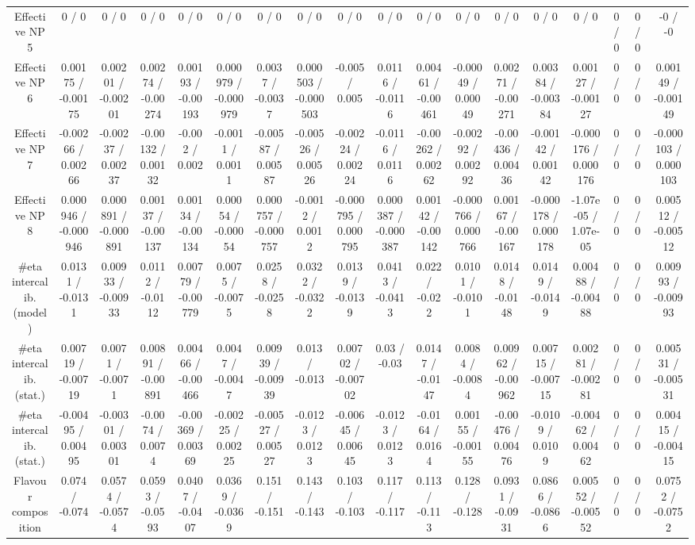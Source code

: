 \documentclass[10pt]{article}
\begin{document}
\begin{table}[htbp]
\begin{center}
\begin{tabular}{|c|c|c|c|c|c|c|c|c|c|c|c|c|c|c|c|c|c|}
  Effective NP 5 & 0 / 0 & 0 / 0 & 0 / 0 & 0 / 0 & 0 / 0 & 0 / 0 & 0 / 0 & 0 / 0 & 0 / 0 & 0 / 0 & 0 / 0 & 0 / 0 & 0 / 0 & 0 / 0 & 0 / 0 & 0 / 0 & -0 / -0 \\ 
  Effective NP 6 & 0.00175 / -0.00175 & 0.00201 / -0.00201 & 0.00274 / -0.00274 & 0.00193 / -0.00193 & 0.000979 / -0.000979 & 0.0037 / -0.0037 & 0.000503 / -0.000503 & -0.005 / 0.005 & 0.0116 / -0.0116 & 0.00461 / -0.00461 & -0.00049 / 0.00049 & 0.00271 / -0.00271 & 0.00384 / -0.00384 & 0.00127 / -0.00127 & 0 / 0 & 0 / 0 & 0.00149 / -0.00149 \\ 
  Effective NP 7 & -0.00266 / 0.00266 & -0.00237 / 0.00237 & -0.00132 / 0.00132 & -0.002 / 0.002 & -0.0011 / 0.0011 & -0.00587 / 0.00587 & -0.00526 / 0.00526 & -0.00224 / 0.00224 & -0.0116 / 0.0116 & -0.00262 / 0.00262 & -0.00292 / 0.00292 & -0.00436 / 0.00436 & -0.00142 / 0.00142 & -0.000176 / 0.000176 & 0 / 0 & 0 / 0 & -0.000103 / 0.000103 \\ 
  Effective NP 8 & 0.000946 / -0.000946 & 0.000891 / -0.000891 & 0.00137 / -0.00137 & 0.00134 / -0.00134 & 0.00054 / -0.00054 & 0.000757 / -0.000757 & -0.0012 / 0.0012 & -0.000795 / 0.000795 & 0.000387 / -0.000387 & 0.00142 / -0.00142 & -0.000766 / 0.000766 & 0.00167 / -0.00167 & -0.000178 / 0.000178 & -1.07e-05 / 1.07e-05 & 0 / 0 & 0 / 0 & 0.00512 / -0.00512 \\ 
  #eta intercalib. (model) & 0.0131 / -0.0131 & 0.00933 / -0.00933 & 0.0112 / -0.0112 & 0.00779 / -0.00779 & 0.0075 / -0.0075 & 0.0258 / -0.0258 & 0.0322 / -0.0322 & 0.0139 / -0.0139 & 0.0413 / -0.0413 & 0.022 / -0.022 & 0.0101 / -0.0101 & 0.0148 / -0.0148 & 0.0149 / -0.0149 & 0.00488 / -0.00488 & 0 / 0 & 0 / 0 & 0.00993 / -0.00993 \\ 
  #eta intercalib. (stat.) & 0.00719 / -0.00719 & 0.0071 / -0.0071 & 0.00891 / -0.00891 & 0.00466 / -0.00466 & 0.0047 / -0.0047 & 0.00939 / -0.00939 & 0.013 / -0.013 & 0.00702 / -0.00702 & 0.03 / -0.03 & 0.0147 / -0.0147 & 0.0084 / -0.0084 & 0.00962 / -0.00962 & 0.00715 / -0.00715 & 0.00281 / -0.00281 & 0 / 0 & 0 / 0 & 0.00531 / -0.00531 \\ 
  #eta intercalib. (stat.) & -0.00495 / 0.00495 & -0.00301 / 0.00301 & -0.0074 / 0.0074 & -0.00369 / 0.00369 & -0.00225 / 0.00225 & -0.00527 / 0.00527 & -0.0123 / 0.0123 & -0.00645 / 0.00645 & -0.0123 / 0.0123 & -0.0164 / 0.0164 & 0.00155 / -0.00155 & -0.00476 / 0.00476 & -0.0109 / 0.0109 & -0.00462 / 0.00462 & 0 / 0 & 0 / 0 & 0.00415 / -0.00415 \\ 
  Flavour composition & 0.074 / -0.074 & 0.0574 / -0.0574 & 0.0593 / -0.0593 & 0.0407 / -0.0407 & 0.0369 / -0.0369 & 0.151 / -0.151 & 0.143 / -0.143 & 0.103 / -0.103 & 0.117 / -0.117 & 0.113 / -0.113 & 0.128 / -0.128 & 0.0931 / -0.0931 & 0.0866 / -0.0866 & 0.00552 / -0.00552 & 0 / 0 & 0 / 0 & 0.0752 / -0.0752 \\ 

\end{tabular}
\end{center}
\end{table}
\end{document}

